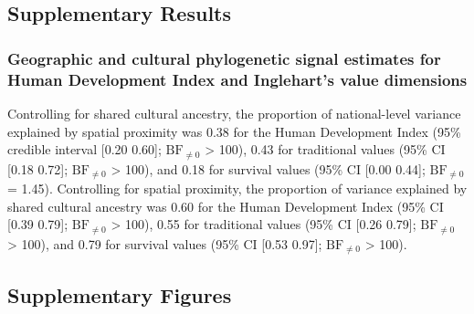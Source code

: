 \documentclass[
  english,
  man,floatsintext]{apa6}
\begin{document}
\begin{appendix}
\newpage

\hypertarget{supplementary-results}{%
\subsection{Supplementary Results}\label{supplementary-results}}

\hypertarget{geographic-and-cultural-phylogenetic-signal-estimates-for-human-development-index-and-ingleharts-value-dimensions}{%
\subsubsection{Geographic and cultural phylogenetic signal estimates for
Human Development Index and Inglehart's value
dimensions}\label{geographic-and-cultural-phylogenetic-signal-estimates-for-human-development-index-and-ingleharts-value-dimensions}}

Controlling for shared cultural ancestry, the proportion of
national-level variance explained by spatial proximity was 0.38 for the
Human Development Index (95\% credible interval {[}0.20 0.60{]};
\(\text{BF}_{\neq0}\) \textgreater{} 100), 0.43 for traditional values
(95\% CI {[}0.18 0.72{]}; \(\text{BF}_{\neq0}\) \textgreater{} 100), and
0.18 for survival values (95\% CI {[}0.00 0.44{]}; \(\text{BF}_{\neq0}\)
= 1.45). Controlling for spatial proximity, the proportion of variance
explained by shared cultural ancestry was 0.60 for the Human Development
Index (95\% CI {[}0.39 0.79{]}; \(\text{BF}_{\neq0}\) \textgreater{}
100), 0.55 for traditional values (95\% CI {[}0.26 0.79{]};
\(\text{BF}_{\neq0}\) \textgreater{} 100), and 0.79 for survival values
(95\% CI {[}0.53 0.97{]}; \(\text{BF}_{\neq0}\) \textgreater{} 100).

\newpage

\hypertarget{supplementary-figures}{%
\subsection{Supplementary Figures}\label{supplementary-figures}}





















\end{appendix}
\end{document}
